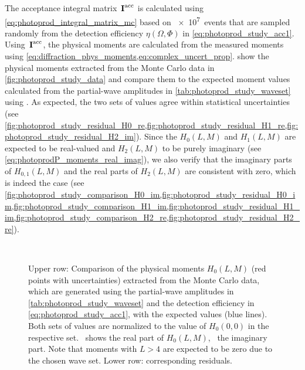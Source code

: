 The acceptance integral matrix~$\bm{\mathrm{I}}^\text{acc}$ is calculated
using \cref{eq:photoprod_integral_matrix_mc} based on \num{e7}~events
that are sampled randomly from the detection efficiency $\eta(\Omega,
\Phi)$ in \cref{eq:photoprod_study_acc1}.  Using~$\bm{\mathrm{I}}^\text{acc}$,
the physical moments are calculated from the measured moments using
\cref{eq:diffraction_phys_moments,eq:complex_uncert_prop}.
show the physical moments extracted from the Monte Carlo data in
\cref{fig:photoprod_study_data} and compare them to the expected
moment values calculated from the partial-wave amplitudes in
\cref{tab:photoprod_study_waveset} using
.
As expected, the two sets of values  agree within statistical
uncertainties (see
\cref{fig:photoprod_study_residual_H0_re,fig:photoprod_study_residual_H1_re,fig:photoprod_study_residual_H2_im}).
Since the $H_0(L, M)$ and $H_1(L, M)$ are expected to be real-valued
and $H_2(L, M)$ to be purely imaginary (see
\cref{eq:photoprodP_moments_real_imag}), we also verify that the
imaginary parts of $H_{0, 1}(L, M)$ and the real parts of $H_2(L, M)$
are consistent with zero, which is indeed the case (see
\cref{fig:photoprod_study_comparison_H0_im,fig:photoprod_study_residual_H0_im,fig:photoprod_study_comparison_H1_im,fig:photoprod_study_residual_H1_im,fig:photoprod_study_comparison_H2_re,fig:photoprod_study_residual_H2_re}).

\begin{figure}[tbp]
  \centering%
  \\%
  \caption{Upper row: Comparison of the physical moments $H_0(L, M)$
  (red points with uncertainties) extracted from the Monte Carlo data,
  which are generated using the partial-wave amplitudes in
  \cref{tab:photoprod_study_waveset} and the detection efficiency in
  \cref{eq:photoprod_study_acc1}, with the expected values (blue
  lines).  Both sets of values are normalized to the value of $H_0(0,
  0)$ in the respective set.
  ~shows the real
  part of $H_0(L, M)$,
  ~the imaginary
  part.  Note that moments with $L > 4$ are expected to be zero due to
  the chosen wave set.  Lower row: corresponding residuals.}%
  \label{fig:photoprod_study_output_H0}%
\end{figure}

